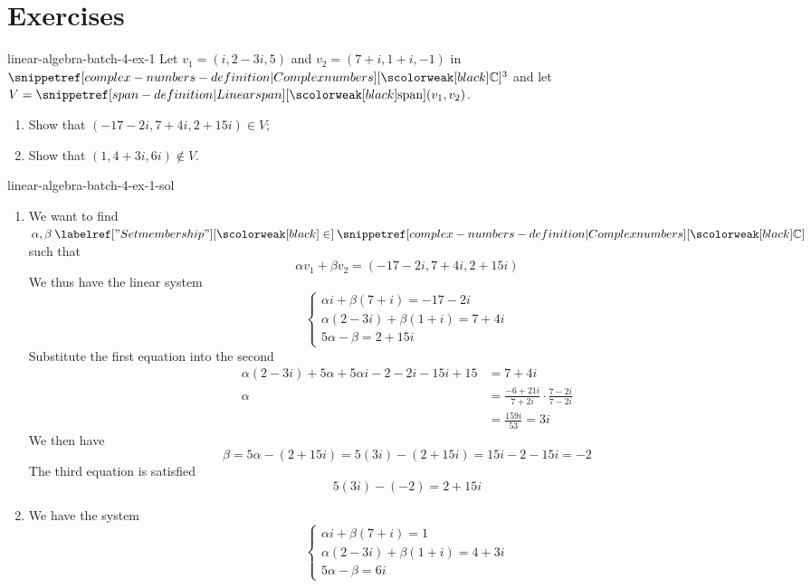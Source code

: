 \documentclass[preview]{standalone}
\begin{document}
\genpage

\section{Exercises}

\begin{snippetexercise}{linear-algebra-batch-4-ex-1}{}
    Let \(v_1 = (i, 2-3i, 5)\) and \(v_2=(7+i, 1+i, -1)\) in \(\complexnumbers^3\)
    and let \(V = \linearspan(v_1, v_2)\).
    \begin{enumerate}
        \item Show that \((-17-2i, 7+4i, 2+15i) \in V\);
        \item Show that \((1,4+3i,6i) \notin V\).
    \end{enumerate}
\end{snippetexercise}

\begin{snippetsolution}{linear-algebra-batch-4-ex-1-sol}{}
    \begin{enumerate}
        \item We want to find \(\alpha, \beta \in \complexnumbers\) such that
        \[  \alpha v_1 + \beta v_2 = (-17-2i, 7+4i, 2+15i) \]
        We thus have the linear system 
        \[
            \begin{cases}
                \alpha i + \beta(7+i) = -17-2i \\
                \alpha(2-3i) + \beta(1 + i) = 7 + 4i \\
                5\alpha - \beta = 2 + 15i
            \end{cases}
        \]
        Substitute the first equation into the second
        \begin{align*}
            \alpha(2-3i) + 5\alpha + 5\alpha i - 2 -2i - 15i + 15 &= 7 + 4i \\
            \alpha &= \frac{-6 + 21i}{7 + 2i} \cdot \frac{7-2i}{7-2i} \\
            &= \frac{159i}{53} = 3i
        \end{align*}
        We then have
        \[
            \beta = 5\alpha - (2 + 15i) = 5(3i) - (2 + 15i) = 15i - 2 - 15i = -2
        \]
        The third equation is satisfied
        \[
            5(3i) - (-2) = 2 + 15i
        \]
        \item We have the system
        \[
            \begin{cases}
                \alpha i + \beta(7+i) = 1 \\
                \alpha(2-3i) + \beta(1 + i) = 4+3i \\
                5\alpha - \beta = 6i
            \end{cases}
        \]
    \end{enumerate}
\end{snippetsolution}
\end{document}
